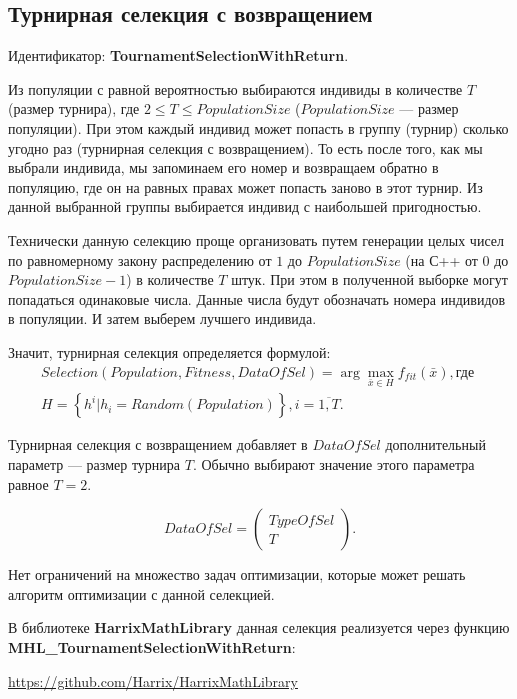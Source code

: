 \subsection{Турнирная селекция с возвращением}\label{SetOfOperatorsAlgorithms:TournamentSelectionWithReturn}

Идентификатор: \textbf{TournamentSelectionWithReturn}.

Из популяции с равной вероятностью выбираются индивиды в количестве $ T $ (размер турнира), где $ 2\leq T\leq PopulationSize $ ($ PopulationSize $ --- размер популяции). При этом каждый индивид может попасть в группу (турнир) сколько угодно раз (турнирная селекция с возвращением). То есть после того, как мы выбрали индивида, мы запоминаем его номер и возвращаем обратно в популяцию, где он на равных правах может попасть заново в этот турнир. Из данной выбранной группы выбирается индивид с наибольшей пригодностью.

Технически данную селекцию проще организовать путем генерации целых чисел по равномерному закону распределению от $ 1 $ до $ PopulationSize $ (на С++ от $ 0 $ до $ PopulationSize-1 $) в количестве $ T $ штук. При этом в полученной выборке могут попадаться одинаковые числа. Данные числа будут обозначать номера индивидов в популяции. И затем выберем лучшего индивида.

Значит, турнирная селекция определяется формулой:
\begin{align}
\label{SetOfOperatorsAlgorithms:eq:TournamentSelectionWithReturn}
Selection\left( Population, Fitness, DataOfSel\right) = \arg{\max_{\bar{x}\in H} {f_{fit}\left( \bar{x}\right) }}, \text{где }\\
H=\left\lbrace h^i | h_i=Random \left( Population \right) \right\rbrace, i=\overline{1,T}\nonumber.
\end{align}

Турнирная селекция с возвращением добавляет в $ DataOfSel $ дополнительный параметр --- размер турнира $ T $. Обычно выбирают значение этого параметра равное $ T=2 $.

\begin{equation}
DataOfSel=\left( \begin{array}{c} TypeOfSel \\ T \end{array} \right).
\end{equation}

Нет ограничений на множество задач оптимизации, которые может решать алгоритм оптимизации с данной селекцией.

В библиотеке \textbf{HarrixMathLibrary} данная селекция реализуется через функцию \textbf{MHL\_TournamentSelectionWithReturn}:

\href{https://github.com/Harrix/HarrixMathLibrary}{https://github.com/Harrix/HarrixMathLibrary}